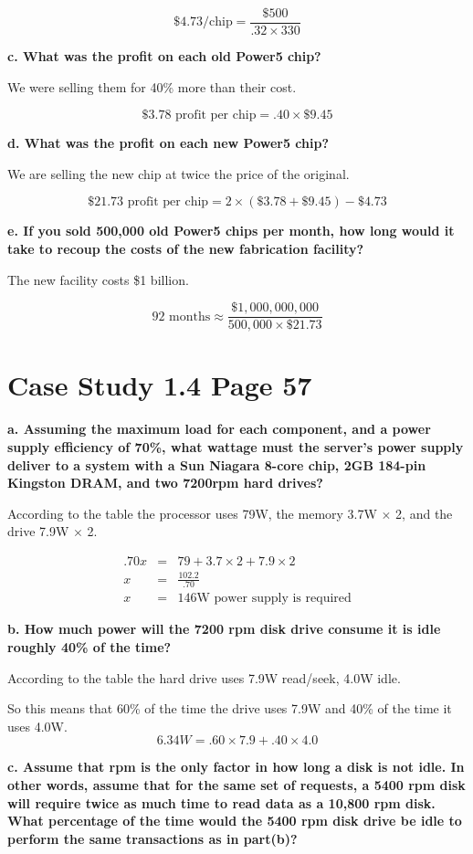 \documentclass[12pt,twoside,letterpaper]{article}
\begin{document}
$$\textrm{\$4.73/chip} = \frac{\$500}{.32 \times 330}$$

\textbf{c. What was the profit on each old Power5 chip?}

We were selling them for 40\% more than their cost.

$$\textrm{\$3.78 profit per chip} = .40 \times \$9.45$$

\textbf{d. What was the profit on each new Power5 chip?}

We are selling the new chip at twice the price of the original.

$$\textrm{\$21.73 profit per chip} = 2 \times (\$3.78 + \$9.45) - \$4.73$$

\textbf{e. If you sold 500,000 old Power5 chips per month, how long would it take to recoup the costs of the new fabrication facility?}

The new facility costs \$1 billion.

$$\textrm{92 months} \approx \frac{\$1,000,000,000}{500,000 \times \$21.73}$$

\section*{Case Study 1.4 Page 57}
\textbf{a. Assuming the maximum load for each component, and a power supply efficiency of 70\%, what wattage must the server's power supply deliver to a system with a Sun Niagara 8-core chip, 2GB 184-pin Kingston DRAM, and two 7200rpm hard drives?}

According to the table the processor uses 79W, the memory 3.7W $\times$ 2, and the drive 7.9W $\times$ 2.

$$ \begin{array}{rcl}
.70x & = & 79 + 3.7 \times 2 + 7.9 \times 2 \\
x & = & \frac{102.2}{.70} \\
x & = & 146\textrm{W power supply is required}
\end{array} $$

\textbf{b. How much power will the 7200 rpm disk drive consume it is idle roughly 40\% of the time?}

According to the table the hard drive uses 7.9W read/seek, 4.0W idle.

So this means that 60\% of the time the drive uses 7.9W and 40\% of the time it uses 4.0W.
$$6.34W = .60 \times 7.9 + .40 \times 4.0$$

\textbf{c. Assume that rpm is the only factor in how long a disk is not idle. In other words, assume that for the same set of requests, a 5400 rpm disk will require twice as much time to read data as a 10,800 rpm disk. What percentage of the time would the 5400 rpm disk drive be idle to perform the same transactions as in part(b)?}
\end{document}
